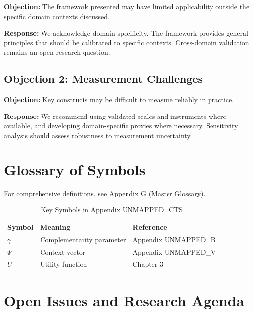 \textbf{Objection:} The framework presented may have limited applicability
outside the specific domain contexts discussed.

\textbf{Response:} We acknowledge domain-specificity. The framework provides
general principles that should be calibrated to specific contexts. Cross-domain
validation remains an open research question.

\subsection{Objection 2: Measurement Challenges}

\textbf{Objection:} Key constructs may be difficult to measure reliably in
practice.

\textbf{Response:} We recommend using validated scales and instruments where
available, and developing domain-specific proxies where necessary. Sensitivity
analysis should assess robustness to measurement uncertainty.



\section{Glossary of Symbols}
\label{sec:cts-glossary}

For comprehensive definitions, see Appendix G (Master Glossary).

\begin{table}[htbp]
\centering
\caption{Key Symbols in Appendix UNMAPPED_CTS}
\begin{tabular}{lll}
\toprule
\textbf{Symbol} & \textbf{Meaning} & \textbf{Reference} \\
\midrule
$\gamma$ & Complementarity parameter & Appendix UNMAPPED_B \\
$\Psi$ & Context vector & Appendix UNMAPPED_V \\
$U$ & Utility function & Chapter 3 \\
\bottomrule
\end{tabular}
\end{table}



\section{Open Issues and Research Agenda}
\label{sec:cts-open}

